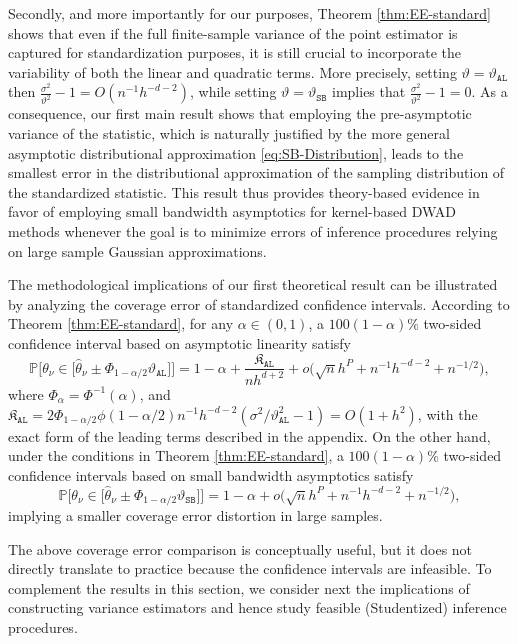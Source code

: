 \documentclass[11pt]{article}
\numberwithin{equation}{section}
\theoremstyle{definition}
\renewcommand{\P}{\mathbb{P}}
\newcommand{\Scale}{\vartheta}
\begin{document}
Secondly, and more importantly for our purposes, Theorem \ref{thm:EE-standard} shows that even if the full finite-sample variance of the point estimator is captured for standardization purposes, it is still crucial to incorporate the variability of both the linear and quadratic terms. More precisely, setting $\Scale=\Scale_\mathtt{AL}$ then $\tfrac{\sigma^2}{\Scale^2} - 1 = O(n^{-1}h^{-d-2})$, while setting $\Scale=\Scale_\mathtt{SB}$ implies that $\tfrac{\sigma^2}{\Scale^2} - 1 = 0$. As a consequence, our first main result shows that employing the pre-asymptotic variance of the statistic, which is naturally justified by the more general asymptotic distributional approximation \eqref{eq:SB-Distribution}, leads to the smallest error in the distributional approximation of the sampling distribution of the standardized statistic. This result thus provides theory-based evidence in favor of employing small bandwidth asymptotics for kernel-based DWAD methods whenever the goal is to minimize errors of inference procedures relying on large sample Gaussian approximations.

The methodological implications of our first theoretical result can be illustrated by analyzing the coverage error of standardized confidence intervals. According to Theorem \ref{thm:EE-standard}, for any $\alpha\in(0,1)$, a $100(1-\alpha)\%$ two-sided confidence interval based on asymptotic linearity satisfy 
\begin{equation*}
    \P\Big[ \theta_\nu \in \big[ \widehat{\theta}_\nu \pm \Phi_{1-\alpha/2} \Scale_\mathtt{AL}\big] \Big]
    = 1-\alpha + \frac{\mathfrak{K}_\mathtt{AL}}{nh^{d+2}} 
      + o\big(\sqrt{n}h^{P} + n^{-1}h^{-d-2} + n^{-1/2}\big),
\end{equation*}
where $\Phi_{\alpha} = \Phi^{-1}(\alpha)$, and $\mathfrak{K}_\mathtt{AL} = 2 \Phi_{1-\alpha/2} \phi(1-\alpha/2) n^{-1}h^{-d-2} (\sigma^2 / \Scale_\mathtt{AL}^2 - 1) = O(1+h^2)$, with the exact form of the leading terms described in the appendix. On the other hand, under the conditions in Theorem \ref{thm:EE-standard}, a $100(1-\alpha)\%$ two-sided confidence intervals based on small bandwidth asymptotics satisfy
\begin{equation*}
    \P\Big[ \theta_\nu \in \big[ \widehat{\theta}_\nu \pm \Phi_{1-\alpha/2} \Scale_\mathtt{SB}\big] \Big]
    = 1-\alpha 
      + o\big(\sqrt{n}h^{P} + n^{-1}h^{-d-2} + n^{-1/2}\big),
\end{equation*}
implying a smaller coverage error distortion in large samples.

The above coverage error comparison is conceptually useful, but it does not directly translate to practice because the confidence intervals are infeasible. To complement the results in this section, we consider next the implications of constructing variance estimators and hence study feasible (Studentized) inference procedures.
\end{document}
